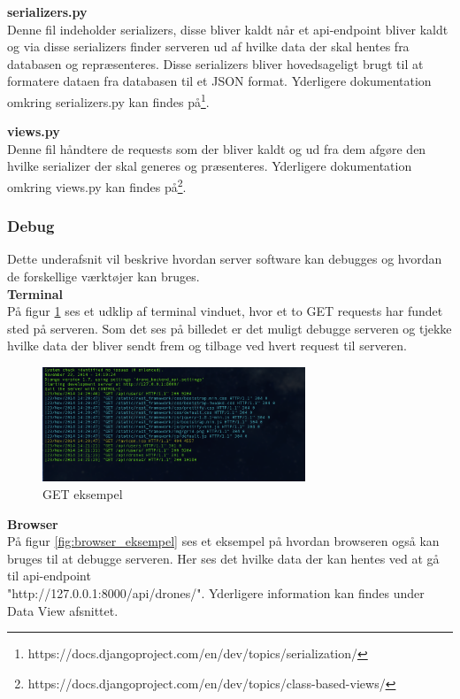 \textbf{serializers.py} \\
Denne fil indeholder serializers, disse bliver kaldt når et api-endpoint bliver kaldt og via disse serializers finder serveren ud af hvilke data der skal hentes fra databasen og repræsenteres. Disse serializers bliver hovedsageligt brugt til at formatere dataen fra databasen til et JSON format. Yderligere dokumentation omkring serializers.py kan findes på\footnote{https://docs.djangoproject.com/en/dev/topics/serialization/}.

\textbf{views.py} \\
Denne fil håndtere de requests som der bliver kaldt og ud fra dem afgøre den hvilke serializer der skal generes og præsenteres. Yderligere dokumentation omkring views.py kan findes på\footnote{https://docs.djangoproject.com/en/dev/topics/class-based-views/}.
\newpage

\subsubsection{Debug}
Dette underafsnit vil beskrive hvordan server software kan debugges og hvordan de forskellige værktøjer kan bruges.\\

\textbf{Terminal}\\
På figur \ref{fig:get_eksempel} ses et udklip af terminal vinduet, hvor et to GET requests har fundet sted på serveren. Som det ses på billedet er det muligt debugge serveren og tjekke hvilke data der bliver sendt frem og tilbage ved hvert request til serveren. 

\begin{figure}[H]
	\centering
	\includegraphics[width=0.7\textwidth]{Billeder/implementation/get_eksempel.png}
	\caption{GET eksempel}
	\label{fig:get_eksempel}
\end{figure}

\textbf{Browser}\\
På figur \ref{fig:browser_eksempel} ses et eksempel på hvordan browseren også kan bruges til at debugge serveren. Her ses det hvilke data der kan hentes ved at gå til api-endpoint\\
"http://127.0.0.1:8000/api/drones/". Yderligere information kan findes under Data View afsnittet.

